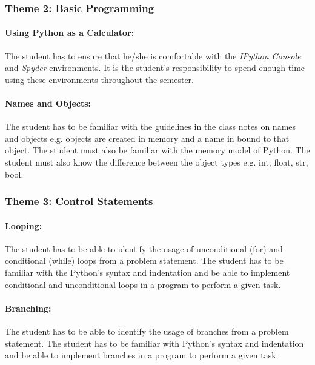             
        \subsubsection{Theme 2: Basic Programming}
            \paragraph{Using Python as a Calculator:}
                The student has to ensure that he/she is comfortable with the 
                \emph{IPython Console} and \emph{Spyder} environments. It is the
                student’s responsibility to spend enough time using these 
                environments throughout the semester.

            \paragraph{Names and Objects:}
                The student has to be familiar with the guidelines in the class 
                notes on names and objects e.g. objects are created in memory and
                a name in bound to that object. The student must also be familiar
                with the memory model of Python. The student must also know the
                difference between the object types e.g. int, float, str, bool.

                
        \subsubsection{Theme 3: Control Statements}
            \paragraph{Looping:}
                The student has to be able to identify the usage of unconditional 
                (for) and conditional (while) loops from a problem statement. 
                The student has to be familiar with the Python's syntax and 
                indentation and be able to implement conditional and unconditional
                loops in a program to perform a given task.
            
            \paragraph{Branching:}
                The student has to be able to identify the usage of branches from 
                a problem statement. The student has to be familiar with 
                Python's syntax and indentation and be able to implement branches 
                in a program to perform a given task.


